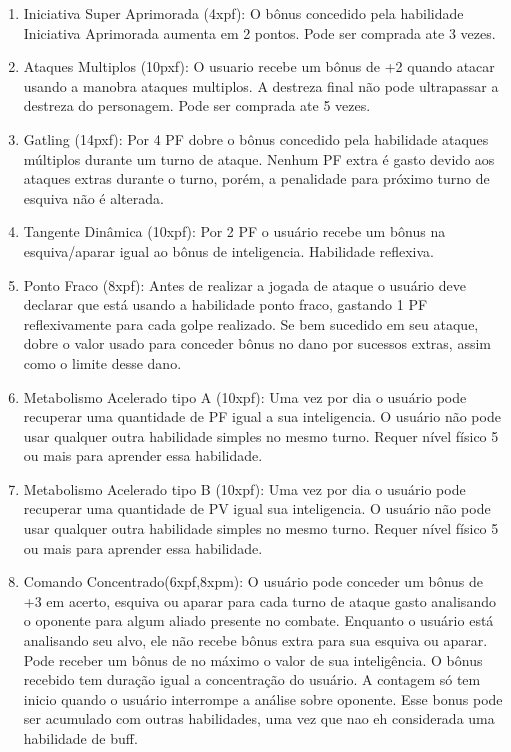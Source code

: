 \begin{enumerate}
	\item Iniciativa Super Aprimorada (4xpf): O bônus concedido pela habilidade Iniciativa Aprimorada aumenta em 2 pontos. Pode ser comprada ate 3 vezes.

	\item Ataques Multiplos (10pxf): O usuario recebe um bônus de +2 quando atacar usando a manobra ataques multiplos. A destreza final não pode ultrapassar a destreza do personagem. Pode ser comprada ate 5 vezes. 
	
	\item Gatling (14pxf): Por 4 PF dobre o bônus concedido pela habilidade ataques múltiplos durante um turno de ataque. Nenhum PF extra é gasto devido aos ataques extras durante o turno, porém, a penalidade para próximo turno de esquiva não é alterada.	

	\item Tangente Dinâmica (10xpf): Por 2 PF o usuário recebe um bônus na esquiva/aparar igual ao bônus de inteligencia. Habilidade reflexiva.

	\item Ponto Fraco (8xpf): Antes de realizar a jogada de ataque o usuário deve declarar que está usando a habilidade ponto fraco, gastando 1 PF reflexivamente para cada golpe realizado. Se bem sucedido em seu ataque, dobre o valor usado para conceder bônus no dano por sucessos extras, assim como o limite desse dano.
 
	\item Metabolismo Acelerado tipo A (10xpf): Uma vez por dia o usuário pode recuperar uma quantidade de PF igual a sua inteligencia. O usuário não pode usar qualquer outra habilidade simples no mesmo turno. Requer nível físico 5 ou mais para aprender essa habilidade. 

	\item Metabolismo Acelerado tipo B (10xpf): Uma vez por dia o usuário pode recuperar uma quantidade de PV igual sua inteligencia. O usuário não pode usar qualquer outra habilidade simples no mesmo turno. Requer nível físico 5 ou mais para aprender essa habilidade. 
 	 
	\item Comando Concentrado(6xpf,8xpm): O usuário pode conceder um bônus de +3 em acerto, esquiva ou aparar para cada turno de ataque gasto analisando o oponente para algum aliado presente no combate. Enquanto o usuário está analisando seu alvo, ele não recebe bônus extra para sua esquiva ou aparar. Pode receber um bônus de no máximo o valor de sua inteligência. O bônus recebido tem duração igual a concentração do usuário. A contagem só tem inicio quando o usuário interrompe a análise sobre oponente. Esse bonus pode ser acumulado com outras habilidades, uma vez que nao eh considerada uma habilidade de buff.
 

\end{enumerate}
